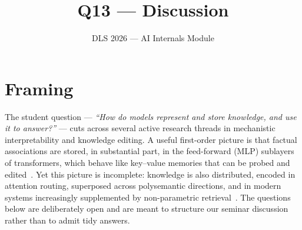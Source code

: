\documentclass[11pt]{article}
\title{Q13 --- Discussion}
\author{DLS 2026 --- AI Internals Module}
\date{}
\begin{document}
\maketitle

\section*{Framing}

The student question --- \emph{``How do models represent and store knowledge, and use it to answer?''} --- cuts across several active research threads in mechanistic interpretability and knowledge editing. A useful first-order picture is that factual associations are stored, in substantial part, in the feed-forward (MLP) sublayers of transformers, which behave like key--value memories that can be probed and edited~\citep{geva2021kv,meng2022rome}. Yet this picture is incomplete: knowledge is also distributed, encoded in attention routing, superposed across polysemantic directions, and in modern systems increasingly supplemented by non-parametric retrieval~\citep{lewis2020rag}. The questions below are deliberately open and are meant to structure our seminar discussion rather than to admit tidy answers.
\end{document}
